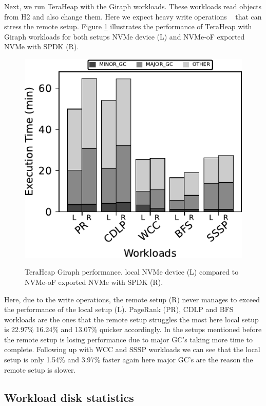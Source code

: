 Next, we run TeraHeap with the Giraph workloads. These workloads read objects
from H2 and also change them. Here we expect heavy write operations
~\cite{giraph,teraheap} that can stress the remote setup. Figure
\ref{fig:bench_giraph} illustrates the performance of TeraHeap with Giraph
workloads for both setups NVMe device (L) and NVMe-oF exported NVMe with SPDK
(R).

\begin{figure}[H]
  \includegraphics[width=\linewidth]{figures/bench_giraph.pdf}\\
\caption{TeraHeap Giraph performance. local NVMe device (L) compared to NVMe-oF exported NVMe with SPDK (R).}
\label{fig:bench_giraph}
\end{figure}
Here, due to the write operations, the remote setup (R) never manages to exceed the performance of the local setup (L). PageRank (PR), CDLP and BFS workloads are the ones that the remote setup struggles the most here local setup is 22.97\% 16.24\% and 13.07\% quicker accordingly. In the setups mentioned before the remote setup is losing performance due to major GC's taking more time to complete. Following up with WCC and SSSP workloads we can see that the local setup is only 1.54\%	and 3.97\% faster again here major GC's are the reason the remote setup is slower.

\subsection{Workload disk statistics}

